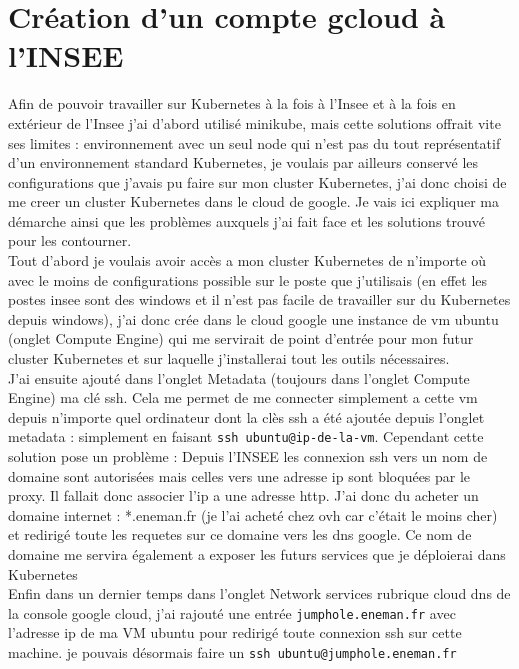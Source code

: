 \documentclass[11pt,fleqn]{book} %
\begin{document}
\section*{Création d'un compte gcloud à l'INSEE}
Afin de pouvoir travailler sur Kubernetes à la fois à l'Insee et à la fois en extérieur de l'Insee j'ai d'abord utilisé minikube, mais cette solutions offrait vite ses limites : environnement avec un seul node qui n'est pas du tout représentatif d'un environnement standard Kubernetes, je voulais par ailleurs conservé les configurations que j'avais pu faire sur mon cluster Kubernetes, j'ai donc choisi de me creer un cluster Kubernetes dans le cloud de google. Je vais ici expliquer ma démarche ainsi que les problèmes auxquels j'ai fait face et les solutions trouvé pour les contourner.\\

Tout d'abord je voulais avoir accès a mon cluster Kubernetes de n'importe où avec le moins de configurations possible sur le poste que j'utilisais (en effet les postes insee sont des windows et il n'est pas facile de travailler sur du Kubernetes depuis windows), j'ai donc crée dans le cloud google une instance de vm ubuntu (onglet Compute Engine)  qui me servirait de point d'entrée pour mon futur cluster Kubernetes et sur laquelle j'installerai tout les outils nécessaires.\\

J'ai ensuite ajouté dans l'onglet Metadata (toujours dans l'onglet Compute Engine) ma clé ssh. Cela me permet de me connecter simplement a cette vm depuis n'importe quel ordinateur dont la clès ssh a été ajoutée depuis l'onglet metadata : simplement en faisant \texttt{ssh ubuntu@ip-de-la-vm}. Cependant cette solution pose un problème :  Depuis l'INSEE les connexion ssh vers un nom de domaine sont autorisées mais celles vers une adresse ip sont bloquées par le proxy. Il fallait donc associer l'ip a une adresse http. J'ai donc du acheter un domaine internet : *.eneman.fr (je l'ai acheté chez ovh car c'était le moins cher) et redirigé toute les requetes sur ce domaine vers les dns google. Ce nom de domaine me servira également a exposer les futurs services que je déploierai dans Kubernetes\\

Enfin dans un dernier temps dans l'onglet Network services rubrique cloud dns de la console google cloud, j'ai rajouté une entrée \texttt{jumphole.eneman.fr} avec l'adresse ip de ma VM ubuntu pour redirigé toute connexion ssh sur cette machine. je pouvais désormais faire un  \texttt{ssh ubuntu@jumphole.eneman.fr}\\
\end{document}

